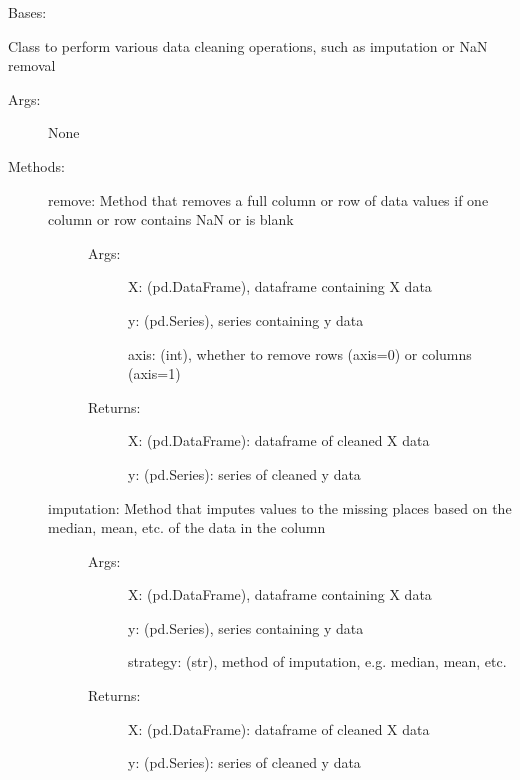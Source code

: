 \documentclass[letterpaper,10pt,english]{sphinxmanual}
\begin{document}
\begin{fulllineitems}
\label{\detokenize{api/mastml.data_cleaning.DataCleaning:mastml.data_cleaning.DataCleaning}}
Bases: 

Class to perform various data cleaning operations, such as imputation or NaN removal
\begin{description}
\item[{Args:}] \leavevmode
None

\item[{Methods:}] \leavevmode\begin{description}
\item[{remove: Method that removes a full column or row of data values if one column or row contains NaN or is blank}] \leavevmode\begin{description}
\item[{Args:}] \leavevmode
X: (pd.DataFrame), dataframe containing X data

y: (pd.Series), series containing y data

axis: (int), whether to remove rows (axis=0) or columns (axis=1)

\item[{Returns:}] \leavevmode
X: (pd.DataFrame): dataframe of cleaned X data

y: (pd.Series): series of cleaned y data

\end{description}

\item[{imputation: Method that imputes values to the missing places based on the median, mean, etc. of the data in the column}] \leavevmode\begin{description}
\item[{Args:}] \leavevmode
X: (pd.DataFrame), dataframe containing X data

y: (pd.Series), series containing y data

strategy: (str), method of imputation, e.g. median, mean, etc.

\item[{Returns:}] \leavevmode
X: (pd.DataFrame): dataframe of cleaned X data

y: (pd.Series): series of cleaned y data

\end{description}


\end{description}
\end{description}
\end{fulllineitems}
\end{document}
